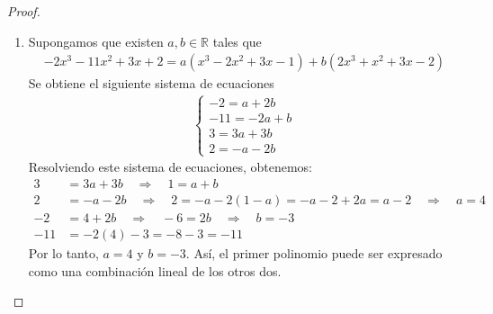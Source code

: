 \documentclass[11pt,letterpaper]{article}
\newcommand{\R}{\mathbb{R}}
\begin{document}
\begin{proof}
\begin{enumerate}
        \item Supongamos que existen $a,b\in\R$ tales que
        \begin{align*}
            -2x^3 - 11x^2 + 3x + 2 = a(x^3 - 2x^2 + 3x - 1) + b(2x^3 + x^2 + 3x - 2)
        \end{align*}
        Se obtiene el siguiente sistema de ecuaciones
        \begin{align*}
            \begin{cases}
                -2 = a + 2b \\
                -11 = -2a + b \\
                3 = 3a + 3b \\
                2 = -a - 2b
            \end{cases}
        \end{align*}
        Resolviendo este sistema de ecuaciones, obtenemos:
        \begin{align*}
            3 &= 3a + 3b \quad \Rightarrow \quad 1 = a + b \\
            2 &= -a - 2b \quad \Rightarrow \quad 2 = -a - 2(1 - a) = -a - 2 + 2a = a - 2 \quad \Rightarrow \quad a = 4 \\
            -2 &= 4 + 2b \quad \Rightarrow \quad -6 = 2b \quad \Rightarrow \quad b = -3 \\
            -11 &= -2(4) -3= -8 -3= -11
        \end{align*}
        Por lo tanto, $a = 4$ y $b = -3$. Así, el primer polinomio puede ser expresado como una combinación lineal de los otros dos.
    \end{enumerate}
\end{proof}
\end{document}
